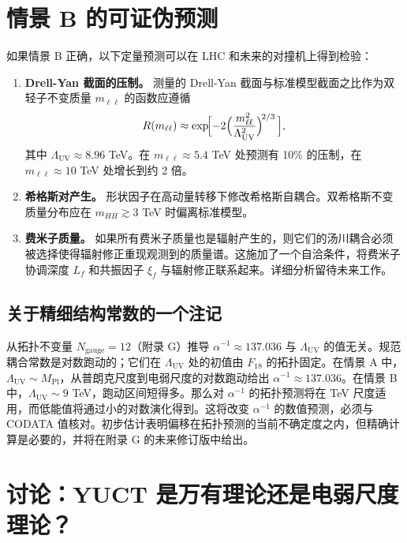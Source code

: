 \documentclass[11pt,a4paper]{article}
\newcommand{\Mpl}{M_{\mathrm{Pl}}}
\newcommand{\LUV}{\Lambda_{\mathrm{UV}}}
\theoremstyle{remark}
\begin{document}
	\section{情景 B 的可证伪预测}
	\label{sec:predictions}
	
	如果情景 B 正确，以下定量预测可以在 LHC 和未来的对撞机上得到检验：
	
	\begin{enumerate}[label=(\arabic*)]
		\item \textbf{Drell-Yan 截面的压制。} 测量的 Drell-Yan 截面与标准模型截面之比作为双轻子不变质量 \(m_{\ell\ell}\) 的函数应遵循
		\[
		R(m_{\ell\ell}) \approx \exp\!\Bigl[-2\Bigl(\frac{m_{\ell\ell}^2}{\LUV^2}\Bigr)^{\!2/3}\,\Bigr],
		\]
		其中 \(\LUV \approx 8.96\) TeV。在 \(m_{\ell\ell} \approx 5.4\) TeV 处预测有 10\% 的压制，在 \(m_{\ell\ell} \approx 10\) TeV 处增长到约 2 倍。
		
		\item \textbf{希格斯对产生。} 形状因子在高动量转移下修改希格斯自耦合。双希格斯不变质量分布应在 \(m_{HH} \gtrsim 3\) TeV 时偏离标准模型。
		
		\item \textbf{费米子质量。} 如果所有费米子质量也是辐射产生的，则它们的汤川耦合必须被选择使得辐射修正重现观测到的质量谱。这施加了一个自洽条件，将费米子协调深度 \(L_f\) 和共振因子 \(\xi_f\) 与辐射修正联系起来。详细分析留待未来工作。
	\end{enumerate}
	
	\subsection{关于精细结构常数的一个注记}
	
	从拓扑不变量 \(N_{\mathrm{gauge}} = 12\)（附录 G）推导 \(\alpha^{-1} \approx 137.036\) 与 \(\LUV\) 的值无关。规范耦合常数是对数跑动的；它们在 \(\LUV\) 处的初值由 \(F_{18}\) 的拓扑固定。在情景 A 中，\(\LUV \sim \Mpl\)，从普朗克尺度到电弱尺度的对数跑动给出 \(\alpha^{-1} \approx 137.036\)。在情景 B 中，\(\LUV \sim 9\) TeV，跑动区间短得多。那么对 \(\alpha^{-1}\) 的拓扑预测将在 TeV 尺度适用，而低能值将通过小的对数演化得到。这将改变 \(\alpha^{-1}\) 的数值预测，必须与 CODATA 值核对。初步估计表明偏移在拓扑预测的当前不确定度之内，但精确计算是必要的，并将在附录 G 的未来修订版中给出。
	
	\section{讨论：YUCT 是万有理论还是电弱尺度理论？}
	\label{sec:discussion}
	
\end{document}
